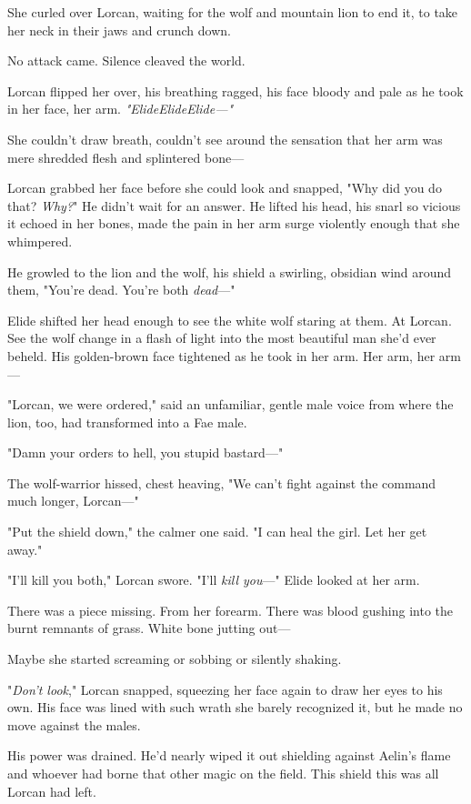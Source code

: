 She curled over Lorcan, waiting for the wolf and mountain lion to end it, to take her neck in their jaws and crunch down.

No attack came. Silence cleaved the world.

Lorcan flipped her over, his breathing ragged, his face bloody and pale as he took in her face, her arm. \emph{"ElideElideElide---"}

She couldn't draw breath, couldn't see around the sensation that her arm was mere shredded flesh and splintered bone---

Lorcan grabbed her face before she could look and snapped, "Why did you do that? \emph{Why?}" He didn't wait for an answer. He lifted his head, his snarl so vicious it echoed in her bones, made the pain in her arm surge violently enough that she whimpered.

He growled to the lion and the wolf, his shield a swirling, obsidian wind around them, "You're dead. You're both \emph{dead}---"

Elide shifted her head enough to see the white wolf staring at them. At Lorcan. See the wolf change in a flash of light into the most beautiful man she'd ever beheld. His golden-brown face tightened as he took in her arm. Her arm, her arm---

"Lorcan, we were ordered," said an unfamiliar, gentle male voice from where the lion, too, had transformed into a Fae male.

"Damn your orders to hell, you stupid bastard---"

The wolf-warrior hissed, chest heaving, "We can't fight against the command much longer, Lorcan---"

"Put the shield down," the calmer one said. "I can heal the girl. Let her get away."

"I'll kill you both," Lorcan swore. "I'll \emph{kill you}---" Elide looked at her arm.

There was a piece missing. From her forearm. There was blood gushing into the burnt remnants of grass. White bone jutting out---

Maybe she started screaming or sobbing or silently shaking.

"\emph{Don't look}," Lorcan snapped, squeezing her face again to draw her eyes to his own. His face was lined with such wrath she barely recognized it, but he made no move against the males.

His power was drained. He'd nearly wiped it out shielding against Aelin's flame and whoever had borne that other magic on the field. This shield  this was all Lorcan had left.

